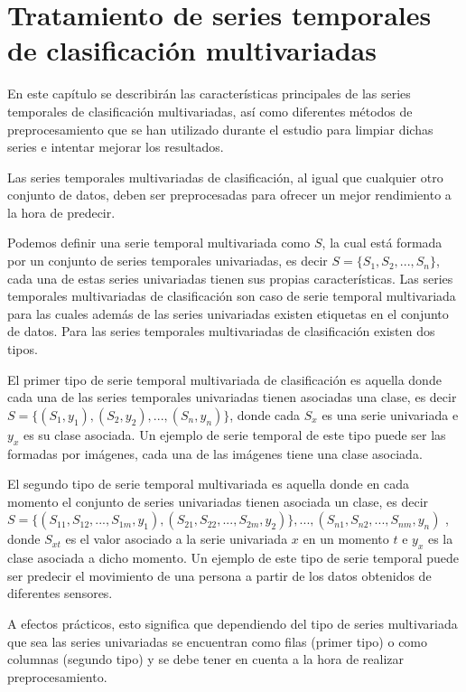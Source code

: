 \chapter{Tratamiento de series temporales de clasificación multivariadas}
En este capítulo se describirán las características principales de las series temporales de clasificación multivariadas, así como diferentes métodos de preprocesamiento que se han utilizado durante el estudio para limpiar dichas series e intentar mejorar los resultados.\newline

Las series temporales multivariadas de clasificación, al igual que cualquier otro conjunto de datos, deben ser preprocesadas para ofrecer un mejor rendimiento a la hora de predecir.\newline

Podemos definir una serie temporal multivariada como $S$, la cual está formada por un conjunto de series temporales univariadas, es decir $S = \{S_1,S_2,...,S_n\}$, cada una de estas series univariadas tienen sus propias características. Las series temporales multivariadas de clasificación son caso de serie temporal multivariada para las cuales además de las series univariadas existen etiquetas en el conjunto de datos. Para las series temporales multivariadas de clasificación existen dos tipos. \newline

El primer tipo de serie temporal multivariada de clasificación es aquella donde cada una de las series temporales univariadas tienen asociadas una clase, es decir $ S = \{(S_1,y_1), (S_2,y_2), ..., (S_n,y_n)\}$, donde cada $S_x$ es una serie univariada e $y_x$ es su clase asociada. Un ejemplo de serie temporal de este tipo puede ser las formadas por imágenes, cada una de las imágenes tiene una clase asociada.\newline

El segundo tipo de serie temporal multivariada es aquella donde en cada momento el conjunto de series univariadas tienen asociada un clase, es decir $S = \{(S_{11},S_{12},...,S_{1m},y_1),(S_{21},S_{22},...,S_{2m},y_2)\}, ..., (S_{n1},S_{n2},...,S_{nm},y_n) $ , donde $S_{xt}$ es el valor asociado a la serie univariada $x$ en un momento $t$ e $y_x$ es la clase asociada a dicho momento. Un ejemplo de este tipo de serie temporal puede ser predecir el movimiento de una persona a partir de los datos obtenidos de diferentes sensores.\newline

A efectos prácticos, esto significa que dependiendo del tipo de series multivariada que sea las series univariadas se encuentran como filas (primer tipo) o como columnas (segundo tipo) y se debe tener en cuenta a la hora de realizar preprocesamiento.\newline

